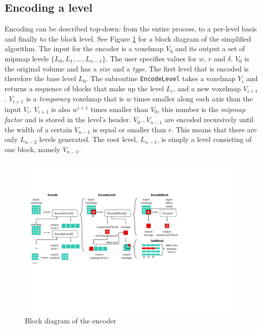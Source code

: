 \subsection{Encoding a level}
Encoding can be described top-down: from the entire process, to a per-level basis and finally to the block level. See Figure \ref{fig:encoder} for a block diagram of the simplified algorithm. The input for the encoder is a voxelmap $V_0$ and its output a set of mipmap levels $\{L_0,L_1,\dotsc,L_{n-1}\}$.  The user specifies values for $w$, $r$ and $\delta$. $V_0$ is the original volume and has a \emph{size} and a \emph{type}. The first level that is encoded is therefore the base level $L_0$. The subroutine \texttt{EncodeLevel} takes a voxelmap $V_i$ and returns a sequence of blocks that make up the level $L_i$, and a new voxelmap $V_{i+1}$. $V_{i+1}$ is a \emph{temporary} voxelmap that is $w$ times smaller along each axis than the input $V_{i}$. $V_{i+1}$ is also $w^{i+1}$ times smaller than $V_0$, this number is the \emph{mipmap factor} and is stored in the level's header. $V_{0} \dots V_{n-1}$ are encoded recursively until the width of a certain $V_{n-1}$ is equal or smaller than $r$. This means that there are only $L_{n-2}$ levels generated. The root level, $L_{n-1}$, is simply a level consisting of one block, namely $V_{n-1}$. 

\begin{figure}[b!]
\includegraphics[scale=0.8]{figures/encoder.pdf} 
\caption{Block diagram of the encoder}
\label{fig:encoder}
\end{figure}
%
